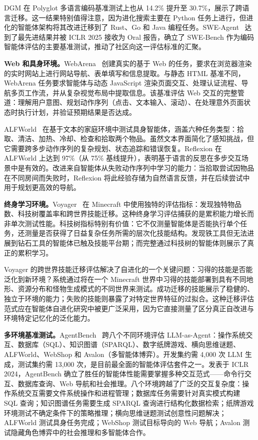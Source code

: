 DGM 在 Polyglot 多语言编码基准测试上也从 14.2\% 提升至 30.7\%，展示了跨语言迁移。这一结果特别值得注意，因为进化搜索主要在 Python 任务上进行，但进化的智能体架构将其改进迁移到了 Rust、Go 和 Java 编程任务。SWE-Agent~\citep{sweagent2024} 达到了最先进结果并被 ICLR 2025 接收为 Oral 报告，确立了 SWE-Bench 作为编码智能体评估的主要基准测试，推动了社区向这一评估标准的汇聚。

\textbf{Web 和具身环境。}WebArena~\citep{zhou2024webarena} 创建真实的基于 Web 的任务，要求在浏览器渲染的实时网站上进行网站导航、表单填写和信息提取。与静态 HTML 基准不同，WebArena 任务要求智能体与动态 JavaScript 渲染页面交互、处理认证流程、导航多页工作流，并从复杂视觉布局中提取信息。该基准评估 Web 交互的完整管道：理解用户意图、规划动作序列（点击、文本输入、滚动）、在处理意外页面状态时执行计划，并验证预期结果是否达成。

ALFWorld~\citep{shridhar2021alfworld} 在基于文本的家庭环境中测试具身智能体，涵盖六种任务类型：拾取、清洁、加热、冷却、检查和拾取两个物品。虽然文本界面简化了感知挑战，但它需要跨多步动作序列的复杂规划、状态追踪和错误恢复。Reflexion 在 ALFWorld 上达到 97\%（从 75\% 基线提升），表明基于语言的反思在多步交互场景中是有效的。改进来自智能体从失败动作序列中学习的能力：当拾取尝试因物品在不同房间而失败时，Reflexion 将此经验存储为自然语言反馈，并在后续尝试中用于规划更高效的导航。

\textbf{终身学习环境。}Voyager~\citep{voyager2023} 在 Minecraft 中使用独特的评估指标：发现独特物品数、科技树覆盖率和跨世界技能迁移。这种终身学习评估捕获的是累积能力增长而非单次测试性能。科技树指标特别有价值：它不仅测量智能体是否能执行单个任务，还测量是否获得了日益复杂任务所需的层次化技能结构。发现铁工具但无法进展到钻石工具的智能体已触及技能平台期；而完整通过科技树的智能体则展示了真正的累积学习。

Voyager 的跨世界技能迁移评估解决了自进化的一个关键问题：习得的技能是否能泛化到新环境？系统通过将在一个 Minecraft 世界中习得的技能部署到具有不同地形、资源分布和怪物生成模式的不同世界来测试。成功迁移的技能展示了稳健的、独立于环境的能力；失败的技能则暴露了对特定世界特征的过拟合。这种迁移评估范式应在智能体自进化研究中被更广泛采用，因为它直接测量了区分真正自改进与环境特定记忆化的泛化能力。

\textbf{多环境基准测试。}AgentBench~\citep{agentbench2024} 跨八个不同环境评估 LLM-as-Agent：操作系统交互、数据库（SQL）、知识图谱（SPARQL）、数字纸牌游戏、横向思维谜题、ALFWorld、WebShop 和 Avalon（多智能体博弈）。开发集约需 4,000 次 LLM 生成，测试集约需 13,000 次，是目前最全面的智能体评估套件之一。发表于 ICLR 2024，AgentBench 确立了胜任的智能体性能需要掌握多种交互范式——命令行交互、数据库查询、Web 导航和社会推理。八个环境跨越了广泛的交互复杂度：操作系统交互需要文件系统操作和进程管理；数据库任务需要针对真实模式构建 SQL 查询；知识图谱任务需要生成 SPARQL 查询进行结构化数据检索；纸牌游戏环境测试不确定条件下的策略推理；横向思维谜题测试创意性问题解决；ALFWorld 测试具身任务完成；WebShop 测试目标导向的 Web 导航；Avalon 测试隐藏角色博弈中的社会推理和多智能体合作。

